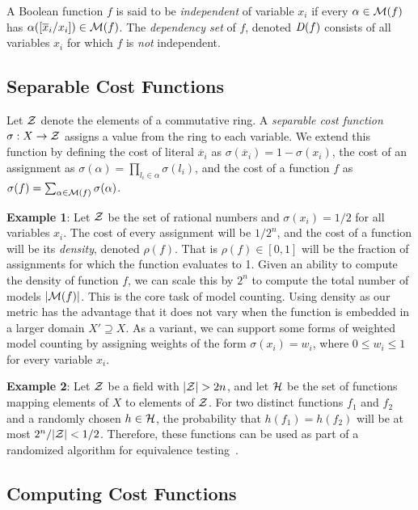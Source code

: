 \documentclass{llncs}
\newcommand{\obar}[1]{\overline{#1}}
\newcommand{\interp}{\alpha}
\newcommand{\interpset}[1]{{\cal M}(#1)}
\newcommand{\ring}{{\cal Z}}
\newcommand{\cost}{\sigma}
\newcommand{\density}{\rho}
\newcommand{\hashset}{{\cal H}}
\newcommand{\fhash}{h}
\newcommand{\depend}{{\it D}}
\newcommand{\subs}[2]{[#2/#1]}
\begin{document}
A Boolean function $f$ is said to be {\em independent} of variable
$x_i$ if every $\interp \in \interpset{f}$ has $\interp(\subs{x_i}{\obar{x}_i})
\in \interpset{f}$.  The {\em dependency set} of $f$, denoted
$\depend(f)$ consists of all variables $x_i$ for which $f$ is {\em
  not} independent.

\subsection{Separable Cost Functions}

Let $\ring$ denote the elements of a commutative ring.  A {\em
  separable cost function} $\cost:X \rightarrow \ring$ assigns a value
from the ring to each variable.  We extend this function by defining
the cost of literal $\obar{x}_i$ as $\cost(\obar{x}_i) = 1 - \cost(x_i)$, the cost
of an assignment as $\cost(\interp) = \prod_{l_i \in \interp}
\cost(l_i)$, and the cost of a function $f$ as $\cost(f) =
\sum_{\interp \in \interpset{f}} \cost(\interp)$.

{\bf Example 1}: Let $\ring$ be the set of rational numbers and
$\cost(x_i) = 1/2$ for all variables $x_i$.  The cost of every
assignment will be $1/2^{n}$, and the cost of a function will be its
{\em density}, denoted $\density(f)$.  That is $\density(f) \in [0,
  1]$ will be the fraction of assignments for which the function
evaluates to 1.  Given an ability to compute the density of function
$f$, we can scale this by $2^n$ to compute the total number of models
$|\interpset{f}|$.  This is the core task of model counting.  Using
density as our metric has the advantage that it does not vary when the
function is embedded in a larger domain $X' \supseteq X$.  As a
variant, we can support some forms of weighted model counting by
assigning weights of the form $\cost(x_i) = w_i$, where $0 \leq w_i
\leq 1$ for every variable $x_i$.

{\bf Example 2}: Let $\ring$ be a field with $|\ring| > 2n$,
and let $\hashset$ be the set of functions
mapping elements of $X$ to elements of $\ring$.  For
two distinct functions $f_1$ and $f_2$ and a randomly chosen $\fhash
\in \hashset$, the probability that $h(f_1) = h(f_2)$ will be at most
$2^n/|\ring|< 1/2$.  Therefore, these functions can be used as part of a
randomized algorithm for equivalence testing~\cite{blum:ipl:1980}.

\subsection{Computing Cost Functions}
\end{document}
